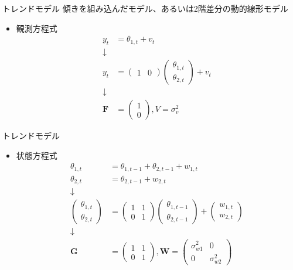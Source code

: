 \documentclass[dvipdfmx,12pt]{beamer}
\begin{document}
\begin{frame}{トレンドモデル}
  傾きを組み込んだモデル、あるいは2階差分の動的線形モデル

  \begin{itemize}
  \item 観測方程式
    \begin{align*}
      y_{t} &= \theta_{1,t} + v_{t} \\
      \downarrow \\
      y_{t} &= \left(\begin{array}{cc}1 & 0\end{array}\right)
        \left(\begin{array}{c}\theta_{1,t} \\ \theta_{2,t} \end{array}\right) + v_{t} \\
        \downarrow \\
        \boldsymbol{F} &= \left(\begin{array}{c}1 \\ 0\end{array}\right),
          V = \sigma_{v}^2 
    \end{align*}
  \end{itemize}
\end{frame}

\begin{frame}{トレンドモデル}
  \begin{itemize}
  \item 状態方程式
    \begin{align*}
      \theta_{1,t} &= \theta_{1,t-1} + \theta_{2,t-1} + w_{1,t} \\
      \theta_{2,t} &= \theta_{2,t-1} + w_{2,t} \\
      \downarrow \\
      \left(\begin{array}{c}\theta_{1,t} \\ \theta_{2,t}\end{array}\right) &=
      \left(\begin{array}{cc}1 & 1 \\ 0 & 1 \end{array}\right)
      \left(\begin{array}{c}\theta_{1,t-1} \\ \theta_{2,t-1}\end{array}\right) +
      \left(\begin{array}{c}w_{1,t} \\ w_{2,t}\end{array}\right) \\
      \downarrow \\
      \boldsymbol{G} &= \left(\begin{array}{cc}1 & 1 \\ 0 & 1 \end{array}\right),
      \boldsymbol{W} = \left(\begin{array}{cc}\sigma_{w1}^2 & 0\\ 0 & \sigma_{w2}^2\end{array}\right)
    \end{align*}
  \end{itemize}
\end{frame}
\end{document}
